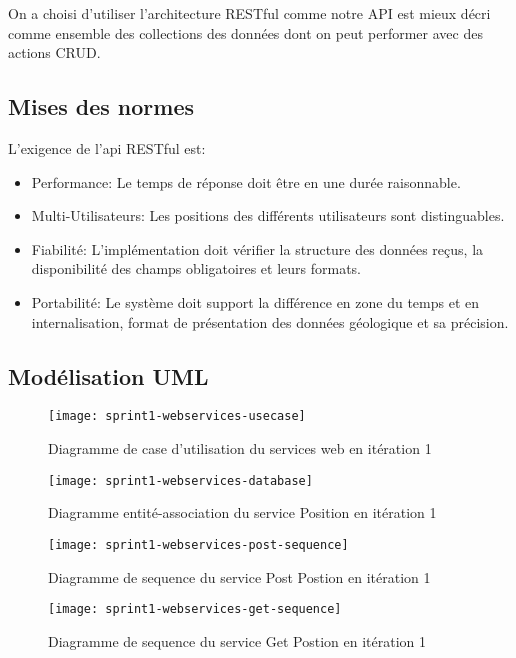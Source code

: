 On a choisi d'utiliser l'architecture RESTful comme notre API est mieux décri
comme ensemble des collections des données dont on peut performer avec des
actions CRUD.

\subsection{Mises des normes}

L'exigence de l'api RESTful est:
\begin{itemize}
    \item Performance: Le temps de réponse doit être en une durée raisonnable.
    \item Multi-Utilisateurs: Les positions des différents utilisateurs sont
        distinguables.
    \item Fiabilité: L'implémentation doit vérifier la structure des données
        reçus, la disponibilité des champs obligatoires et leurs formats.
    \item Portabilité: Le système doit support la différence en zone du temps
        et en internalisation, format de présentation des données géologique et
        sa précision.
\end{itemize}


\subsection{Modélisation UML}

\begin{figure}[htbp]
  \centering
  \texttt{[image: sprint1-webservices-usecase]}
  \caption{Diagramme de case d'utilisation du services web en itération 1}
  \label{fig:sprint1-webservices-usecase}
\end{figure}

\begin{figure}[htbp]
    \centering
    \texttt{[image: sprint1-webservices-database]}
    \caption{Diagramme entité-association du service Position en itération 1}
\end{figure}

\begin{figure}[htbp]
  \centering
  \texttt{[image: sprint1-webservices-post-sequence]}
  \caption{Diagramme de sequence du service Post Postion en itération 1}
  \label{fig:sprint1-webservices-post-sequence}
\end{figure}

\begin{figure}[htbp]
  \centering
  \texttt{[image: sprint1-webservices-get-sequence]}
  \caption{Diagramme de sequence du service Get Postion en itération 1}
  \label{fig:sprint1-webservices-get-sequence}
\end{figure}

